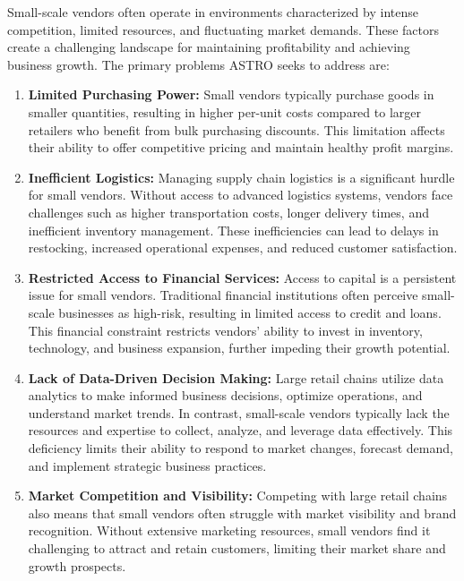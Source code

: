 	Small-scale vendors often operate in environments characterized by intense competition, limited resources, and fluctuating market demands. These factors create a challenging landscape for maintaining profitability and achieving business growth. The primary problems ASTRO seeks to address are:

	\begin{enumerate}
		\item \textbf{Limited Purchasing Power:} Small vendors typically purchase goods in smaller quantities, resulting in higher per-unit costs compared to larger retailers who benefit from bulk purchasing discounts. This limitation affects their ability to offer competitive pricing and maintain healthy profit margins.
		
		\item \textbf{Inefficient Logistics:} Managing supply chain logistics is a significant hurdle for small vendors. Without access to advanced logistics systems, vendors face challenges such as higher transportation costs, longer delivery times, and inefficient inventory management. These inefficiencies can lead to delays in restocking, increased operational expenses, and reduced customer satisfaction.
		
		\item \textbf{Restricted Access to Financial Services:} Access to capital is a persistent issue for small vendors. Traditional financial institutions often perceive small-scale businesses as high-risk, resulting in limited access to credit and loans. This financial constraint restricts vendors’ ability to invest in inventory, technology, and business expansion, further impeding their growth potential.
		
		\item \textbf{Lack of Data-Driven Decision Making:} Large retail chains utilize data analytics to make informed business decisions, optimize operations, and understand market trends. In contrast, small-scale vendors typically lack the resources and expertise to collect, analyze, and leverage data effectively. This deficiency limits their ability to respond to market changes, forecast demand, and implement strategic business practices.
		
		\item \textbf{Market Competition and Visibility:} Competing with large retail chains also means that small vendors often struggle with market visibility and brand recognition. Without extensive marketing resources, small vendors find it challenging to attract and retain customers, limiting their market share and growth prospects.
	\end{enumerate}
	

